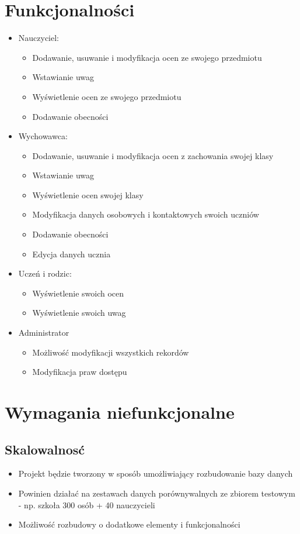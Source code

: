 \documentclass[10pt,a4paper,notitlepage]{article}
\begin{document}
\section{Funkcjonalności}
\begin{itemize}
\item Nauczyciel:
\begin{itemize}
\item Dodawanie, usuwanie i modyfikacja ocen ze swojego przedmiotu
\item Wstawianie uwag
\item Wyświetlenie ocen ze swojego przedmiotu
\item Dodawanie obecności
\end{itemize}
\item Wychowawca:
\begin{itemize}
\item Dodawanie, usuwanie i modyfikacja ocen z zachowania swojej klasy
\item Wstawianie uwag
\item Wyświetlenie ocen swojej klasy
\item Modyfikacja danych osobowych i kontaktowych swoich uczniów
\item Dodawanie obecności
\item Edycja danych ucznia
\end{itemize}


\item Uczeń i rodzic:
\begin{itemize}
\item Wyświetlenie swoich ocen
\item Wyświetlenie swoich uwag
\end{itemize}


\item Administrator
\begin{itemize}
\item Możliwość modyfikacji wszystkich rekordów
\item Modyfikacja praw dostępu
\end{itemize}
\end{itemize}


\section{Wymagania niefunkcjonalne}
\subsection{Skalowalnosć}
\begin{itemize}
\item Projekt będzie tworzony w sposób umożliwiający rozbudowanie bazy danych
\item Powinien działać na zestawach danych porównywalnych ze zbiorem testowym - np. szkoła 300 osób + 40 nauczycieli
\item Możliwość rozbudowy o dodatkowe elementy i funkcjonalności
\end{itemize}
\end{document}
